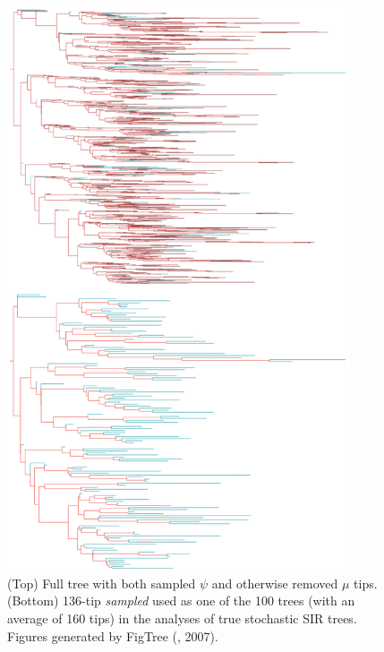 \documentclass[12pt,titlepage]{article}
\begin{document}
\begin{figure}
  \begin{center}
    \includegraphics[width=4in]{Tree_combined.pdf}
  \end{center}
    \caption{(Top) Full tree with both sampled $\psi$ and otherwise removed $\mu$ tips. 
      (Bottom) 136-tip \textit{sampled} used as one of the 100 trees 
      (with an average of 160 tips) in the analyses of true stochastic SIR trees. 
      Figures generated by FigTree (\cite{FigTree}, 2007).}
  \label{fig:Tree}
\end{figure}
% 
\end{document}

